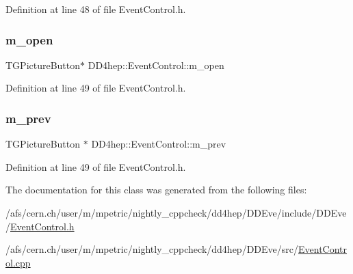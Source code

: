 Definition at line 48 of file Event\+Control.\+h.

\hypertarget{class_d_d4hep_1_1_event_control_ae2a938df9e309454c1170c23c69a4214}{}\label{class_d_d4hep_1_1_event_control_ae2a938df9e309454c1170c23c69a4214} 
\subsubsection{\texorpdfstring{m\+\_\+open}{m\_open}}
{\footnotesize\ttfamily T\+G\+Picture\+Button$\ast$ D\+D4hep\+::\+Event\+Control\+::m\+\_\+open\hspace{0.3cm}{\ttfamily [private]}}



Definition at line 49 of file Event\+Control.\+h.

\hypertarget{class_d_d4hep_1_1_event_control_a5dc965be42f51a9499cb4fecbd269ed5}{}\label{class_d_d4hep_1_1_event_control_a5dc965be42f51a9499cb4fecbd269ed5} 
\subsubsection{\texorpdfstring{m\+\_\+prev}{m\_prev}}
{\footnotesize\ttfamily T\+G\+Picture\+Button $\ast$ D\+D4hep\+::\+Event\+Control\+::m\+\_\+prev\hspace{0.3cm}{\ttfamily [private]}}



Definition at line 49 of file Event\+Control.\+h.



The documentation for this class was generated from the following files\+:\begin{DoxyCompactItemize}
\item 
/afs/cern.\+ch/user/m/mpetric/nightly\+\_\+cppcheck/dd4hep/\+D\+D\+Eve/include/\+D\+D\+Eve/\hyperlink{_event_control_8h}{Event\+Control.\+h}\item 
/afs/cern.\+ch/user/m/mpetric/nightly\+\_\+cppcheck/dd4hep/\+D\+D\+Eve/src/\hyperlink{_event_control_8cpp}{Event\+Control.\+cpp}\end{DoxyCompactItemize}
